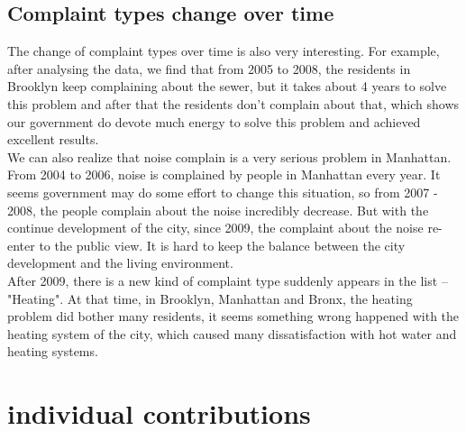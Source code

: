 \documentclass[sigconf]{acmart}
\begin{document}
\subsection{Complaint types change over time}
The change of complaint types over time is also very interesting. For example, after analysing the data, we find that from 2005 to 2008, the residents in Brooklyn keep complaining about the sewer, but it takes about 4 years to solve this problem and after that the residents don't complain about that, which shows our government do devote much energy to solve this problem and achieved excellent results. \\
We can also realize that noise complain is a very serious problem in Manhattan. From 2004 to 2006, noise is complained by people in Manhattan every year. It seems government may do some effort to change this situation, so from 2007 - 2008, the people complain about the noise incredibly decrease. But with the continue development of the city, since 2009, the complaint about the noise re-enter to the public view. It is hard to keep the balance between the city development and the living environment.\\
After 2009, there is a new kind of complaint type suddenly appears in the list -- "Heating". At that time, in Brooklyn, Manhattan and Bronx, the heating problem did bother many residents, it seems something wrong happened with the heating system of the city, which caused many dissatisfaction with hot water and heating systems.



\section{individual contributions}
\end{document}
